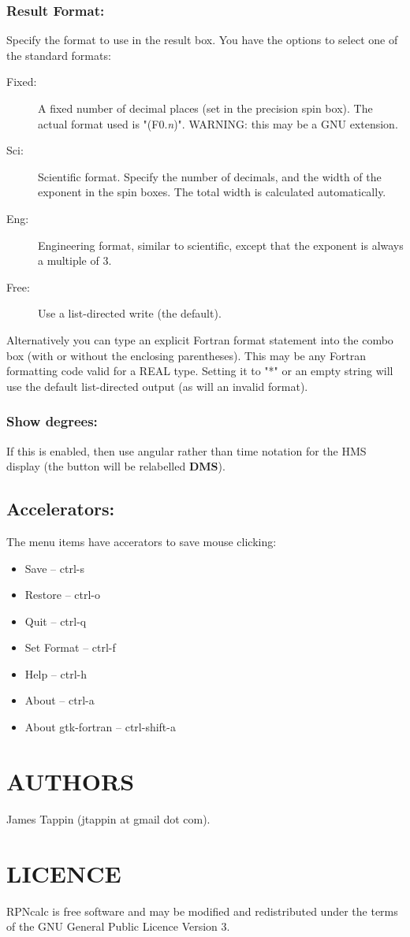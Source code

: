 \documentclass{article}
\begin{document}
\subsubsection{Result Format:}
Specify the format to use in the result box. You have the options to
select one of the standard formats:
\begin{description}
\item [Fixed:] A fixed number of decimal places (set in the precision
  spin box). The actual format used is "(F0.\emph{n})". WARNING: this
  may be a GNU extension.
\item[Sci:] Scientific format. Specify the number of decimals, and the
  width of the exponent in the spin boxes. The total width is
  calculated automatically.
\item[Eng:] Engineering format, similar to scientific, except that the
  exponent is always a multiple of 3.
\item[Free:] Use a list-directed write (the default).
\end{description}
Alternatively you can type an explicit Fortran format statement into
the combo box (with or without the enclosing parentheses). This may be
any Fortran formatting code valid for a REAL type. Setting it to "*" or
an empty string will use the default list-directed output (as will an
invalid format).

\subsubsection{Show degrees:}
If this is enabled, then use angular rather than time notation for the
HMS display (the button will be relabelled \textbf{DMS}).

\subsection{Accelerators:}

The menu items have accerators to save mouse clicking:

\begin{itemize}
\item Save -- ctrl-s
\item Restore -- ctrl-o
\item Quit -- ctrl-q
\item Set Format -- ctrl-f
\item Help -- ctrl-h
\item About -- ctrl-a
\item About gtk-fortran -- ctrl-shift-a
\end{itemize}
\section{AUTHORS}

James Tappin (jtappin at gmail dot com).

\section{LICENCE}

RPNcalc is free software and may be modified and redistributed under
the terms of the GNU General Public Licence Version 3.

\LatexManEnd
\end{document}
